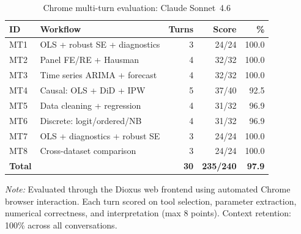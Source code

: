 \begin{table}[htbp]
\centering
\begin{threeparttable}
\caption{Chrome multi-turn evaluation: Claude Sonnet~4.6}
\label{tab:e2e-chrome-mt}
\small
\begin{tabular}{llrrr}
\toprule
ID & Workflow & Turns & Score & \% \\
\midrule
MT1 & OLS + robust SE + diagnostics & 3 & 24/24 & 100.0 \\
MT2 & Panel FE/RE + Hausman & 4 & 32/32 & 100.0 \\
MT3 & Time series ARIMA + forecast & 4 & 32/32 & 100.0 \\
MT4 & Causal: OLS + DiD + IPW & 5 & 37/40 & 92.5 \\
MT5 & Data cleaning + regression & 4 & 31/32 & 96.9 \\
MT6 & Discrete: logit/ordered/NB & 4 & 31/32 & 96.9 \\
MT7 & OLS + diagnostics + robust SE & 3 & 24/24 & 100.0 \\
MT8 & Cross-dataset comparison & 3 & 24/24 & 100.0 \\
\midrule
\textbf{Total} & & \textbf{30} & \textbf{235/240} & \textbf{97.9} \\
\bottomrule
\end{tabular}
\begin{tablenotes}[flushleft]
\item \emph{Note:} Evaluated through the Dioxus web frontend using
automated Chrome browser interaction. Each turn scored on tool selection,
parameter extraction, numerical correctness, and interpretation (max 8
points). Context retention: 100\% across all conversations.
\end{tablenotes}
\end{threeparttable}
\end{table}

